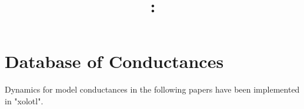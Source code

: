 \documentclass[utf8]{frontiers_suppmat} %
\begin{document}
\onecolumn
{}

\title[Supplementary Material]{{}:
\\ } %


\maketitle


\section{Database of Conductances}

	Dynamics for model conductances in the following papers have been implemented in "xolotl".
	
\end{document}
